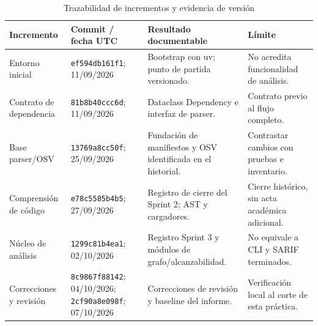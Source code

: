 \begin{table}[H]
\centering\small{}
\caption{Trazabilidad de incrementos y evidencia de versión}
\begin{tabularx}{\textwidth}{P{2.3cm}P{2.6cm}YY}
\toprule
\textbf{Incremento} & \textbf{Commit / fecha UTC} & \textbf{Resultado documentable} & \textbf{Límite} \\
\midrule
Entorno inicial & \texttt{ef594d\allowbreak b161f1}; 11/09/2026 & Bootstrap con uv; punto de partida versionado. & No acredita funcionalidad de análisis. \\
\addlinespace
Contrato de dependencia & \texttt{81b8b4\allowbreak 0ccc6d}; 11/09/2026 & Dataclass Dependency e interfaz de parser. & Contrato previo al flujo completo. \\
\addlinespace
Base parser/OSV & \texttt{13769a\allowbreak 8cc50f}; 25/09/2026 & Fundación de manifiestos y OSV identificada en el historial. & Contrastar cambios con pruebas e inventario. \\
\addlinespace
Comprensión de código & \texttt{e78c55\allowbreak 85b4b5}; 27/09/2026 & Registro de cierre del Sprint 2; AST y cargadores. & Cierre histórico, sin acta académica adicional. \\
\addlinespace
Núcleo de análisis & \texttt{1299c8\allowbreak 1b4ea1}; 02/10/2026 & Registro Sprint 3 y módulos de grafo/alcanzabilidad. & No equivale a CLI y SARIF terminados. \\
\addlinespace
Correcciones y revisión & \texttt{8c9867\allowbreak f88142}; 04/10/2026; \texttt{2cf90a\allowbreak 8e098f}; 07/10/2026 & Correcciones de revisión y baseline del informe. & Verificación local al corte de esta práctica. \\
\bottomrule
\end{tabularx}
\end{table}

